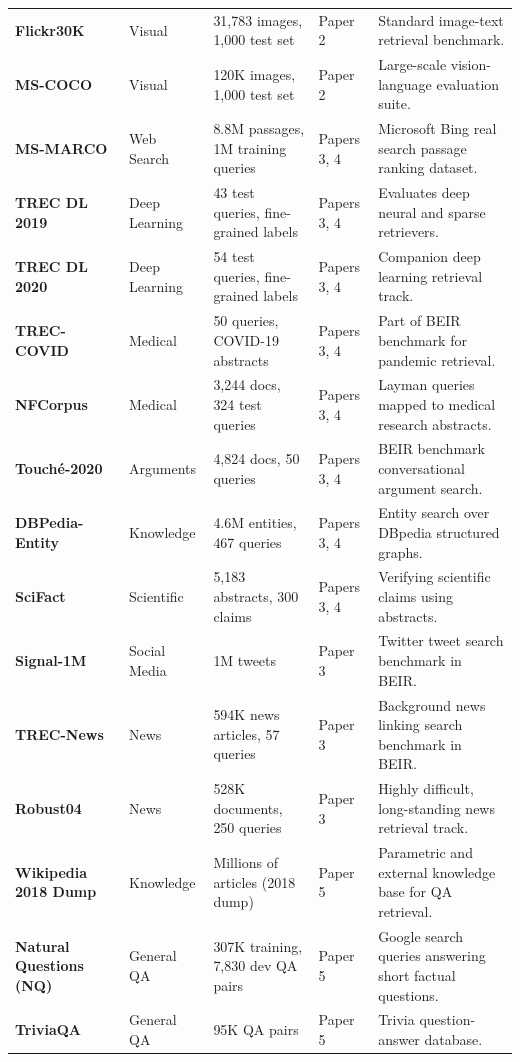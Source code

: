 \documentclass[11pt,a4paper]{article}
\begin{document}
\begin{table}[htbp]
{\begin{tabular}{lllll}
\textbf{Flickr30K} & Visual & 31,783 images, 1,000 test set & Paper 2 & Standard image-text retrieval benchmark. \\
\textbf{MS-COCO} & Visual & 120K images, 1,000 test set & Paper 2 & Large-scale vision-language evaluation suite. \\
\textbf{MS-MARCO} & Web Search & 8.8M passages, 1M training queries & Papers 3, 4 & Microsoft Bing real search passage ranking dataset. \\
\textbf{TREC DL 2019} & Deep Learning & 43 test queries, fine-grained labels & Papers 3, 4 & Evaluates deep neural and sparse retrievers. \\
\textbf{TREC DL 2020} & Deep Learning & 54 test queries, fine-grained labels & Papers 3, 4 & Companion deep learning retrieval track. \\
\textbf{TREC-COVID} & Medical & 50 queries, COVID-19 abstracts & Papers 3, 4 & Part of BEIR benchmark for pandemic retrieval. \\
\textbf{NFCorpus} & Medical & 3,244 docs, 324 test queries & Papers 3, 4 & Layman queries mapped to medical research abstracts. \\
\textbf{Touch\'{e}-2020} & Arguments & 4,824 docs, 50 queries & Papers 3, 4 & BEIR benchmark conversational argument search. \\
\textbf{DBPedia-Entity} & Knowledge & 4.6M entities, 467 queries & Papers 3, 4 & Entity search over DBpedia structured graphs. \\
\textbf{SciFact} & Scientific & 5,183 abstracts, 300 claims & Papers 3, 4 & Verifying scientific claims using abstracts. \\
\textbf{Signal-1M} & Social Media & 1M tweets & Paper 3 & Twitter tweet search benchmark in BEIR. \\
\textbf{TREC-News} & News & 594K news articles, 57 queries & Paper 3 & Background news linking search benchmark in BEIR. \\
\textbf{Robust04} & News & 528K documents, 250 queries & Paper 3 & Highly difficult, long-standing news retrieval track. \\
\textbf{Wikipedia 2018 Dump} & Knowledge & Millions of articles (2018 dump) & Paper 5 & Parametric and external knowledge base for QA retrieval. \\
\textbf{Natural Questions (NQ)} & General QA & 307K training, 7,830 dev QA pairs & Paper 5 & Google search queries answering short factual questions. \\
\textbf{TriviaQA} & General QA & 95K QA pairs & Paper 5 & Trivia question-answer database. \\

\end{tabular}}
\end{table}
\end{document}
